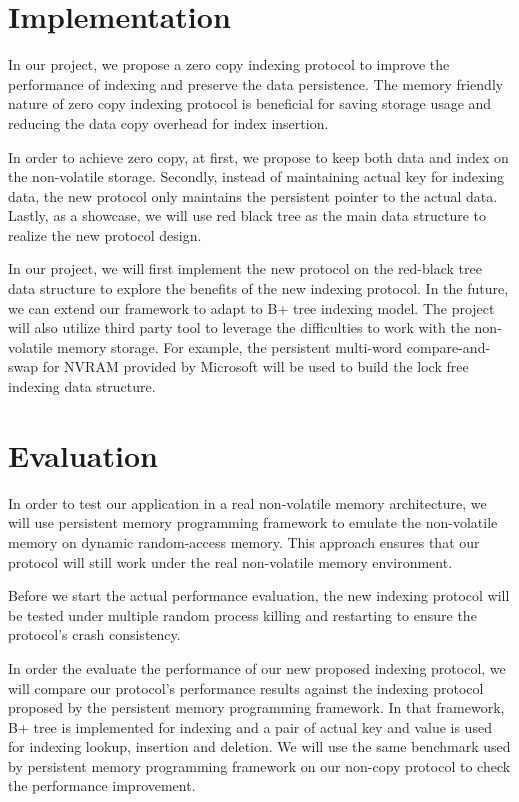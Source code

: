 \section{Implementation}
In our project, we propose a zero copy indexing protocol to improve the performance of indexing and preserve the data persistence. The memory friendly nature of zero copy indexing protocol is beneficial for saving storage usage and reducing the data copy overhead for index insertion. 

In order to achieve zero copy, at first, we propose to keep both data and index on the non-volatile storage. Secondly, instead of maintaining actual key for indexing data, the new protocol only maintains the persistent pointer to the actual data. Lastly, as a showcase, we will use red black tree as the main data structure to realize the new protocol design.

In our project, we will first implement the new protocol on the red-black tree data structure to explore the benefits of the new indexing protocol. In the future, we can extend our framework to adapt to B+ tree indexing model. The project will also utilize third party tool to leverage the difficulties to work with the non-volatile memory storage. For example, the persistent multi-word compare-and-swap for NVRAM provided by Microsoft will be used to build the lock free indexing data structure. 

\section{Evaluation}
In order to test our application in a real non-volatile memory architecture, we will use persistent memory programming framework  \cite{pmem} to emulate the non-volatile memory on dynamic random-access memory. This approach ensures that our protocol will still work under the real non-volatile memory environment. 

Before we start the actual performance evaluation, the new indexing protocol will be tested under multiple random process killing and restarting to ensure the protocol's crash consistency. 

In order the evaluate the performance of our new proposed indexing protocol, we will compare our protocol's performance results against the indexing protocol proposed by the persistent memory programming framework. In that framework, B+ tree is implemented for indexing and a pair of actual key and value is used for indexing lookup, insertion and deletion. We will use the same benchmark used by persistent memory programming framework on our non-copy protocol to check the performance improvement. 

